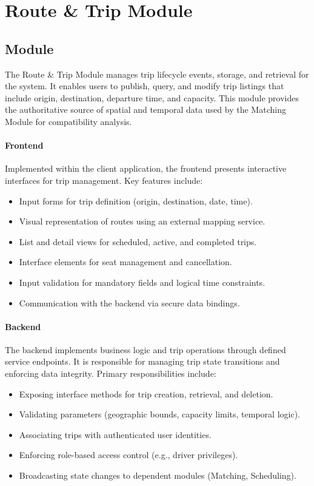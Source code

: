 \section{Route \& Trip Module}

\subsection{Module}
The Route \& Trip Module manages trip lifecycle events, storage, and retrieval for the system. 
It enables users to publish, query, and modify trip listings that include origin, destination, departure time, and capacity. 
This module provides the authoritative source of spatial and temporal data used by the Matching Module for compatibility analysis.

\paragraph{Frontend}
Implemented within the client application, the frontend presents interactive interfaces for trip management. 
Key features include:
\begin{itemize}
    \item Input forms for trip definition (origin, destination, date, time).
    \item Visual representation of routes using an external mapping service.
    \item List and detail views for scheduled, active, and completed trips.
    \item Interface elements for seat management and cancellation.
    \item Input validation for mandatory fields and logical time constraints.
    \item Communication with the backend via secure data bindings.
\end{itemize}

\paragraph{Backend}
The backend implements business logic and trip operations through defined service endpoints. 
It is responsible for managing trip state transitions and enforcing data integrity. 
Primary responsibilities include:
\begin{itemize}
    \item Exposing interface methods for trip creation, retrieval, and deletion.
    \item Validating parameters (geographic bounds, capacity limits, temporal logic).
    \item Associating trips with authenticated user identities.
    \item Enforcing role-based access control (e.g., driver privileges).
    \item Broadcasting state changes to dependent modules (Matching, Scheduling).
\end{itemize}

